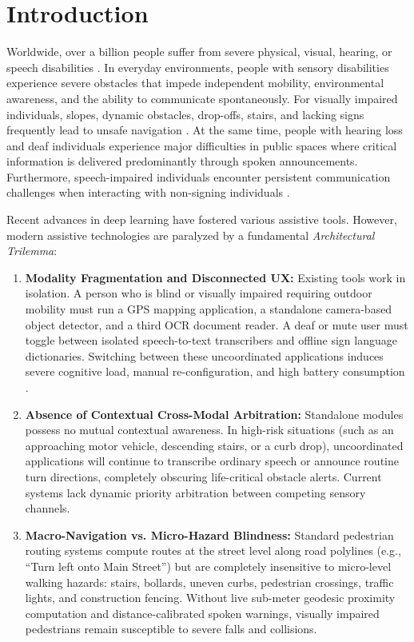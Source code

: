 \documentclass[conference]{IEEEtran}
\begin{document}
\section{Introduction}

Worldwide, over a billion people suffer from severe physical, visual, hearing, or speech disabilities \cite{b1}. In everyday environments, people with sensory disabilities experience severe obstacles that impede independent mobility, environmental awareness, and the ability to communicate spontaneously. For visually impaired individuals, slopes, dynamic obstacles, drop-offs, stairs, and lacking signs frequently lead to unsafe navigation \cite{b3}. At the same time, people with hearing loss and deaf individuals experience major difficulties in public spaces where critical information is delivered predominantly through spoken announcements. Furthermore, speech-impaired individuals encounter persistent communication challenges when interacting with non-signing individuals \cite{b9}.

Recent advances in deep learning have fostered various assistive tools. However, modern assistive technologies are paralyzed by a fundamental \textit{Architectural Trilemma}:
\begin{enumerate}
    \item \textbf{Modality Fragmentation and Disconnected UX:} Existing tools work in isolation. A person who is blind or visually impaired requiring outdoor mobility must run a GPS mapping application, a standalone camera-based object detector, and a third OCR document reader. A deaf or mute user must toggle between isolated speech-to-text transcribers and offline sign language dictionaries. Switching between these uncoordinated applications induces severe cognitive load, manual re-configuration, and high battery consumption \cite{b1,b7}.
    \item \textbf{Absence of Contextual Cross-Modal Arbitration:} Standalone modules possess no mutual contextual awareness. In high-risk situations (such as an approaching motor vehicle, descending stairs, or a curb drop), uncoordinated applications will continue to transcribe ordinary speech or announce routine turn directions, completely obscuring life-critical obstacle alerts. Current systems lack dynamic priority arbitration between competing sensory channels.
    \item \textbf{Macro-Navigation vs. Micro-Hazard Blindness:} Standard pedestrian routing systems compute routes at the street level along road polylines (e.g., ``Turn left onto Main Street'') but are completely insensitive to micro-level walking hazards: stairs, bollards, uneven curbs, pedestrian crossings, traffic lights, and construction fencing. Without live sub-meter geodesic proximity computation and distance-calibrated spoken warnings, visually impaired pedestrians remain susceptible to severe falls and collisions.
\end{enumerate}
\end{document}
